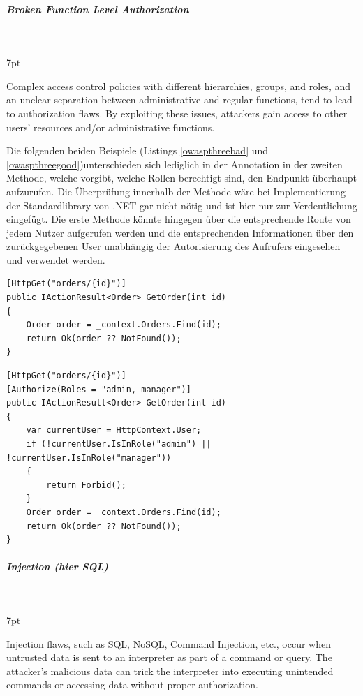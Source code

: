 \documentclass[notitlepage, hidelinks]{article}
\newenvironment{formal}{%
  \def\FrameCommand{%
    \hspace{1pt}%
    {\color{black}\vrule width 2pt}%
    {\color{formalshade}\vrule width 4pt}%
    \colorbox{formalshade}%
  }%
  \MakeFramed{\advance\hsize-\width\FrameRestore}%
  \noindent\hspace{-4.55pt}%
  \begin{adjustwidth}{}{7pt}%
  \vspace{2pt}\vspace{2pt}%
}
{%
  \vspace{2pt}\end{adjustwidth}\endMakeFramed%
}
\begin{document}
\subparagraph{Broken Function Level Authorization} \mbox{} \\
\begin{formal}
Complex access control policies with different hierarchies, groups, and roles, and an unclear separation between administrative and regular functions, tend to lead to authorization flaws. By exploiting these issues, attackers gain access to other users’ resources and/or administrative functions.
\end{formal}

Die folgenden beiden Beispiele (Listings \ref{owaspthreebad} und \ref{owaspthreegood})unterschieden sich lediglich in der Annotation in der zweiten Methode, welche vorgibt, welche Rollen berechtigt sind, den Endpunkt überhaupt aufzurufen. Die Überprüfung innerhalb der Methode wäre bei Implementierung der Standardlibrary von .NET gar nicht nötig und ist hier nur zur Verdeutlichung eingefügt. Die erste Methode könnte hingegen über die entsprechende Route von jedem Nutzer aufgerufen werden und die entsprechenden Informationen über den zurückgegebenen User unabhängig der Autorisierung des Aufrufers eingesehen und verwendet werden.

\begin{lstlisting}[language={[Sharp]C},frame=single,caption=Negativbeispiel Broken Function Level Authorization,label=owaspthreebad]
[HttpGet("orders/{id}")]
public IActionResult<Order> GetOrder(int id)
{
    Order order = _context.Orders.Find(id);
    return Ok(order ?? NotFound());    
}
\end{lstlisting}


\begin{lstlisting}[language={[Sharp]C},frame=single,caption=Positivbeispiel Broken Function Level Authorization,label=owaspthreegood]
[HttpGet("orders/{id}")]
[Authorize(Roles = "admin, manager")]
public IActionResult<Order> GetOrder(int id)
{
    var currentUser = HttpContext.User;
    if (!currentUser.IsInRole("admin") || !currentUser.IsInRole("manager"))
    {
        return Forbid();
    }
    Order order = _context.Orders.Find(id);
    return Ok(order ?? NotFound());
}
\end{lstlisting}


\subparagraph{Injection (hier SQL)} \mbox{} \\
\begin{formal}
Injection flaws, such as SQL, NoSQL, Command Injection, etc., occur when untrusted data is sent to an interpreter as part of a command or query. The attacker's malicious data can trick the interpreter into executing unintended commands or accessing data without proper authorization.
\end{formal}
\end{document}
